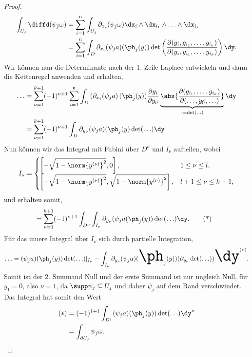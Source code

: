 \begin{proof}
\begin{align*}
\int_{U_j} \diffd(\psi_j\omega) &= \sum\limits_{i=1}^n \int_{U_j}
\partial_{x_i}(\psi_j\omega) \dx_{i}\land \dx_{i_1}\land \ldots\land\dx_{i_k}
\\ &= \sum\limits_{i=1}^n \int_{D}
\partial_{x_i}(\psi_ja)(\ph_j(y))
\det\left(\frac{\partial(g_i,g_{i_1},\ldots,g_{i_k})}{\partial(y_i,y_{i_1},\ldots,y_{i_k})}
\right) \dy.
\end{align*}
Wir können nun die Determinante nach der 1. Zeile Laplace entwickeln und dann
die Kettenregel anwenden und erhalten,
\begin{align*}
\ldots &= \sum\limits_{\nu=1}^{k+1} (-1)^{\nu+1} \sum\limits_{i=1}^n
\int_D \left(\partial_{x_i} (\psi_j a\right)(\ph_j(y)) \frac{\partial
g_i}{\partial y_\nu}
\underbrace{\abs{\frac{\partial(g_{i_1},\ldots,g_{i_k})}{\partial(\ldots,\cancel{y_\nu},\ldots)}}}_{:=\det(\ldots)}\dy\\
&= \sum\limits_{\nu=1}^{k+1}
(-1)^{\nu+1} \int_D \partial_{y_\nu} (\psi_j a)(\ph_j(y)\det(\ldots)\dy
\end{align*}
Nun können wir das Integral mit Fubini über $D^\nu$ und $I_\nu$ aufteilen, wobei
\begin{align*}
I_\nu = \begin{cases}
\left[-\sqrt{1-\norm{y^{(\nu)}}^2},0\right], & 1\le \nu\le l,\\
\left[-\sqrt{1-\norm{y^{(\nu)}}^2},\sqrt{1-\norm{y^{(\nu)}}^2}\right], & l+1\le
\nu\le k+1,
\end{cases}
\end{align*}
und erhalten somit,
\begin{align*}
&= \sum\limits_{\nu=1}^{k+1}
(-1)^{\nu+1}
\int_{D^\nu}
\int_{I_\nu}
\partial_{y_\nu} (\psi_j a(\ph_j(y))\det(\ldots)\dy.\tag{*}
\end{align*}
Für das innere Integral über $I_\nu$ sich durch partielle Integration,
\begin{align*}
\ldots =
(\psi_ja)(\ph_j(y))\det(\ldots)\Huge|_{I_\nu} -
\int_{I_\nu}
\partial_{y_\nu}(\psi_ja)(\ph_j(y))(\partial_{y_\nu}\det(\ldots))
\dy^{(\nu)}.
\end{align*}
Somit ist der 2. Summand Null und der erste Summand ist nur ungleich Null, für
$y_1 = 0$, also $\nu=1$, da $\supp \psi_j \subseteq U_j$ und daher $\psi_j$ auf
dem Rand verschwindet. Das Integral hat somit den Wert
\begin{align*}
(*) &= (-1)^{1+1}\int_{D^1} (\psi_j a)(\ph_j(y)) \det(\ldots)\dy^\nu\\
&= \int_{\partial U_j} \psi_j\omega.\qedhere
\end{align*}
\end{proof}

